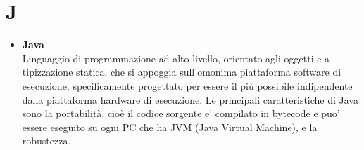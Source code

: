 \chapter{J} \label{J}
\begin{itemize}
	\item \textbf{Java} \\
	 Linguaggio di programmazione ad alto livello, orientato agli oggetti e a tipizzazione statica, che si appoggia sull'omonima piattaforma software di esecuzione, specificamente progettato per essere il più possibile indipendente dalla piattaforma hardware di esecuzione. Le principali caratteristiche di Java sono la portabilità, cioè il codice sorgente e' compilato in bytecode e puo' essere eseguito su ogni PC che ha JVM (Java Virtual Machine), e la robustezza. 
\end{itemize}